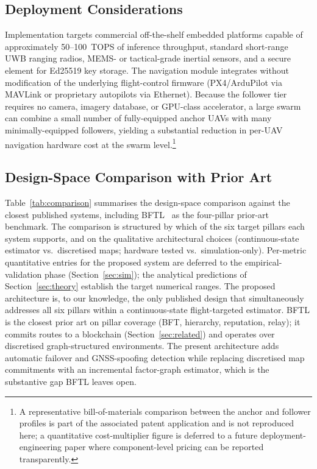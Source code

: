 \documentclass[journal,10pt,twocolumn]{IEEEtran}
\begin{document}
\subsection{Deployment Considerations}

Implementation targets commercial off-the-shelf embedded platforms capable of approximately 50--100~TOPS of inference throughput, standard short-range UWB ranging radios, MEMS- or tactical-grade inertial sensors, and a secure element for Ed25519 key storage. The navigation module integrates without modification of the underlying flight-control firmware (PX4/ArduPilot via MAVLink or proprietary autopilots via Ethernet). Because the follower tier requires no camera, imagery database, or GPU-class accelerator, a large swarm can combine a small number of fully-equipped anchor UAVs with many minimally-equipped followers, yielding a substantial reduction in per-UAV navigation hardware cost at the swarm level.\footnote{A representative bill-of-materials comparison between the anchor and follower profiles is part of the associated patent application and is not reproduced here; a quantitative cost-multiplier figure is deferred to a future deployment-engineering paper where component-level pricing can be reported transparently.}

\subsection{Design-Space Comparison with Prior Art}
\label{sec:comparison}

Table~\ref{tab:comparison} summarises the design-space comparison against the closest published systems, including BFTL~\cite{castelloferrer2022bftl} as the four-pillar prior-art benchmark. The comparison is structured by which of the six target pillars each system supports, and on the qualitative architectural choices (continuous-state estimator vs.\ discretised maps; hardware tested vs.\ simulation-only). Per-metric quantitative entries for the proposed system are deferred to the empirical-validation phase (Section~\ref{sec:sim}); the analytical predictions of Section~\ref{sec:theory} establish the target numerical ranges. The proposed architecture is, to our knowledge, the only published design that simultaneously addresses all six pillars within a continuous-state flight-targeted estimator. BFTL is the closest prior art on pillar coverage (BFT, hierarchy, reputation, relay); it commits routes to a blockchain (Section~\ref{sec:related}) and operates over discretised graph-structured environments. The present architecture adds automatic failover and GNSS-spoofing detection while replacing discretised map commitments with an incremental factor-graph estimator, which is the substantive gap BFTL leaves open.
\end{document}
